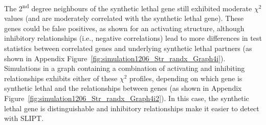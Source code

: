 The 2\textsuperscript{nd} degree neighbours of the \gls{synthetic lethal} gene still exhibited moderate $\chi^2$ values (and are moderately correlated with the \gls{synthetic lethal} gene). These genes could be false positives, as shown for an activating  structure, although inhibitory relationships (i.e., negative correlations) lead to more differences in test statistics between correlated genes and underlying \gls{synthetic lethal} partners (as shown in Appendix Figure~\ref{fig:simulation1206_Str_randx_Graph4i}).
%
Simulations in a graph containing a combination of activating and inhibiting relationships exhibits either of these $\chi^2$ profiles, depending on which gene is \gls{synthetic lethal} and the relationships between genes (as shown in Appendix Figure~\ref{fig:simulation1206_Str_randx_Graph4i2}). In this case, the \gls{synthetic lethal} gene is distinguishable and inhibitory relationships make it easier to detect with \gls{SLIPT}.

\iffalse
\begin{figure*}[!ht]
     \begin{center}
       \subcaptionbox{Graph structure}{%
           \raisebox{0.15\textwidth}{
           \label{fig:simulation1206_Str_randx_Graph4iD:Graph4i}
           \texttt{[image: \{"/home/tomkelly/Documents/PhD Otago Uni/SL\_Model/Graph4iD".pdf]}}
           }
        }%
       \subcaptionbox{$\chi^2$ distribution for each gene}{%
           \label{fig:simulation1206_Str_randx_Graph4iD:vioplot}
           \texttt{[image: \{"/home/tomkelly/Documents/PhD Otago Uni/SL\_Model//RUN\_20161206\_Str\_randx/SL\_Model\_Test\_Graph\_1K\_Graph4i\_ROC\_samples\_SLstry\_vioplot(4)".pdf]}}
        }%
       \end{center}
      \caption[Detection of Synthetic Lethality within an Inhibiting graph structure]{\small \textbf{Detection of Synthetic Lethality within an Inhibiting  Graph structure.} The gene ``D'' was designated to be \gls{synthetic lethal} and the $\chi^2$ value from \gls{SLIPT} was computed for each gene across the \glslink{graph}{graph} structure. The $\chi^2$ values were computed in 100 simulations of datasets of 20,000 genes including the \glslink{graph}{graph} structure and 1000 samples.}
\end{figure*}
\fi


